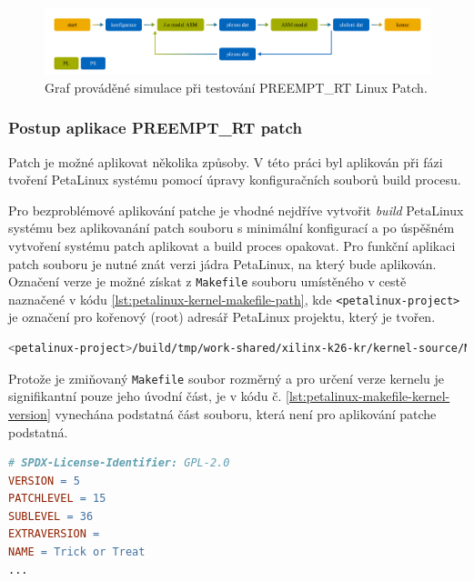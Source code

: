 \documentclass[a4paper, twoside, 11pt]{article}
\newcommand{\fbar}{\FloatBarrier}
\begin{document}
			\begin{figure}[H]
				\centering
					\includegraphics[width=1\textwidth]{src/png/rt-simulation-graph.png} 
					\caption{Graf prováděné simulace při testování PREEMPT\_RT Linux Patch.}
					\label{fig:rt-simulation-graph}
			\end{figure}
			
			\fbar
			\subsubsection{Postup aplikace PREEMPT\_RT patch}
				Patch je možné aplikovat několika způsoby. V této práci byl aplikován při fázi tvoření PetaLinux systému pomocí úpravy konfiguračních souborů build procesu.\par
				Pro bezproblémové aplikování patche je vhodné nejdříve vytvořit \textit{build} PetaLinux systému bez aplikovanání patch souboru s minimální konfigurací a po úspěšném vytvoření systému patch aplikovat a build proces opakovat. Pro funkční aplikaci patch souboru je nutné znát verzi jádra PetaLinux, na který bude aplikován. Označení verze je možné získat z \texttt{Makefile} souboru umístěného v cestě naznačené v kódu \ref{lst:petalinux-kernel-makefile-path}, kde \texttt{<petalinux-project>} je označení pro kořenový (root) adresář PetaLinux projektu, který je tvořen.

				\begin{lstlisting}[language={sh}, caption={Cesta Makefile souboru, ze kterého je možné získat označení verze jádra systému PetaLinux.}, label= {lst:petalinux-kernel-makefile-path}]
<petalinux-project>/build/tmp/work-shared/xilinx-k26-kr/kernel-source/Makefile\end{lstlisting}
				Protože je zmiňovaný \texttt{Makefile} soubor rozměrný a pro určení verze kernelu je signifikantní pouze jeho úvodní část, je v kódu č. \ref{lst:petalinux-makefile-kernel-version} vynechána podstatná část souboru, která není pro aplikování patche podstatná.

				\begin{lstlisting}[language={make}, caption={Významná část Makefile souboru pro určení verze jádra PetaLinux.}, label= {lst:petalinux-makefile-kernel-version}]
# SPDX-License-Identifier: GPL-2.0
VERSION = 5
PATCHLEVEL = 15
SUBLEVEL = 36
EXTRAVERSION =
NAME = Trick or Treat
...\end{lstlisting}
				
\end{document}
